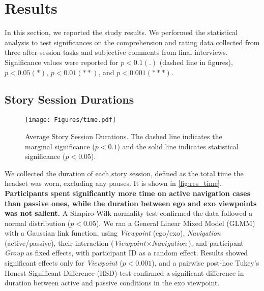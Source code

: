 \section{Results}
In this section, we reported the study results.
We performed the statistical analysis to test significances on the comprehension and rating data collected from three after-session tasks and subjective comments from final interviews. Significance values were reported for $p < 0.1(.)$ (dashed line in figures), $p < 0.05(*)$, $p < 0.01(**)$, and $p < 0.001(***)$.

\subsection{Story Session Durations}
\begin{figure}[h]
\centering
  \texttt{[image: Figures/time.pdf]}
  \caption{Average Story Session Durations. The dashed line indicates the marginal significance ($p < 0.1$) and the solid line indicates statistical significance ($p < 0.05$).}
  \label{fig:res_time}
\end{figure}

We collected the duration of each story session, defined as the total time the headset was worn, excluding any pauses. It is shown in \autoref{fig:res_time}. 
{\textbf{Participants spent significantly more time on active navigation cases than passive ones, while the duration between ego and exo viewpoints was not salient.}} 
A Shapiro-Wilk normality test confirmed the data followed a normal distribution ($p < 0.05$). We ran a General Linear Mixed Model (GLMM) with a Gaussian link function, using \textit{Viewpoint} (ego/exo), \textit{Navigation} (active/passive), their interaction ($\textit{Viewpoint} \times \textit{Navigation}$), and participant \textit{Group} as fixed effects, with participant ID as a random effect. Results showed significant effects only for \textit{Viewpoint} ($p < 0.001$), and a pairwise post-hoc Tukey's Honest Significant Difference (HSD) test confirmed a significant difference in duration between active and passive conditions in the exo viewpoint.

